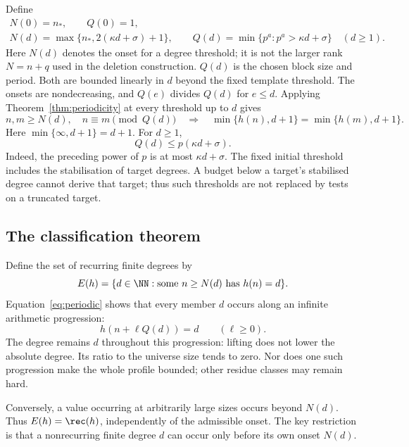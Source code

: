 Define
\begin{equation}\label{eq:NQ}
 \begin{gathered}
 N(0)=n_*,\qquad Q(0)=1,\\
 N(d)=\max\{n_*,2(\kappa d+\sigma)+1\},\qquad
 Q(d)=\min\{p^a:p^a>\kappa d+\sigma\}\quad(d\ge1).
 \end{gathered}
\end{equation}
Here $N(d)$ denotes the onset for a degree threshold; it is not the
larger rank $N=n+q$ used in the deletion construction. $Q(d)$ is the
chosen block size and period. Both are bounded linearly in $d$ beyond
the fixed template threshold.
The onsets are nondecreasing, and $Q(e)$ divides $Q(d)$ for $e\le d$.
Applying Theorem~\ref{thm:periodicity} at every threshold up to $d$ gives
\begin{equation}\label{eq:periodic}
 n,m\ge N(d),\quad n\equiv m\pmod {Q(d)}
 \quad\Longrightarrow\quad
 \min\{h(n),d+1\}=\min\{h(m),d+1\}.
\end{equation}
Here $\min\{\infty,d+1\}=d+1$. For $d\ge1$,
\begin{equation}\label{eq:periodbound}
                         Q(d)\le p(\kappa d+\sigma).
\end{equation}
Indeed, the preceding power of $p$ is at most $\kappa d+\sigma$.
The fixed initial threshold includes the stabilisation of target degrees.
A budget below a target's stabilised degree cannot derive that target;
thus such thresholds are not replaced by tests on a truncated target.

\subsection{The classification theorem}
Define the set of recurring finite degrees by
\[
 E(h)=\{d\in\NN:\text{some }n\ge N(d)\text{ has }h(n)=d\}.
\]
Equation~\eqref{eq:periodic} shows that every member $d$ occurs along an
infinite arithmetic progression:
\[
                  h(n+\ell Q(d))=d\qquad(\ell\ge0).
\]
The degree remains $d$ throughout this progression: lifting does not lower the absolute degree. Its ratio to the universe size tends to zero. Nor does one such progression make the whole profile bounded; other residue classes may remain hard.

Conversely, a value occurring at arbitrarily large sizes occurs beyond
$N(d)$. Thus $E(h)=\rec(h)$, independently of the admissible onset.
The key restriction is that a nonrecurring finite degree $d$ can occur
only before its own onset $N(d)$.

